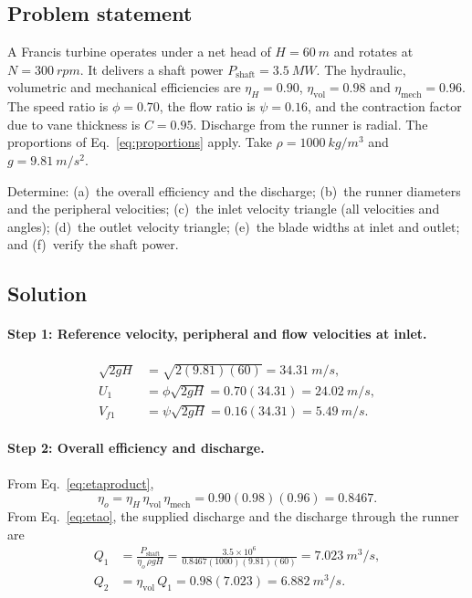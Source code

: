 \documentclass[11pt,a4paper]{article}
\numberwithin{equation}{section}
\begin{document}
\subsection{Problem statement}

A Francis turbine operates under a net head of $H = \SI{60}{m}$ and rotates at $N = \SI{300}{rpm}$. It delivers a shaft power $P_{\mathrm{shaft}} = \SI{3.5}{MW}$. The hydraulic, volumetric and mechanical efficiencies are $\eta_H = 0.90$, $\eta_{\mathrm{vol}} = 0.98$ and $\eta_{\mathrm{mech}} = 0.96$. The speed ratio is $\phi = 0.70$, the flow ratio is $\psi = 0.16$, and the contraction factor due to vane thickness is $C = 0.95$. Discharge from the runner is radial. The proportions of Eq.~\eqref{eq:proportions} apply. Take $\rho = \SI{1000}{kg/m^3}$ and $g = \SI{9.81}{m/s^2}$.

Determine: (a)~the overall efficiency and the discharge; (b)~the runner diameters and the peripheral velocities; (c)~the inlet velocity triangle (all velocities and angles); (d)~the outlet velocity triangle; (e)~the blade widths at inlet and outlet; and (f)~verify the shaft power.

\subsection{Solution}

\paragraph{Step 1: Reference velocity, peripheral and flow velocities at inlet.}
\begin{align}
  \sqrt{2gH} &= \sqrt{2(9.81)(60)} = \SI{34.31}{m/s}, \label{eq:ex-ref}\\
  U_1 &= \phi\sqrt{2gH} = 0.70(34.31) = \SI{24.02}{m/s}, \label{eq:ex-U1}\\
  V_{f1} &= \psi\sqrt{2gH} = 0.16(34.31) = \SI{5.49}{m/s}. \label{eq:ex-Vf1}
\end{align}

\paragraph{Step 2: Overall efficiency and discharge.} From Eq.~\eqref{eq:etaproduct},
\begin{equation}
  \eta_o = \eta_H\,\eta_{\mathrm{vol}}\,\eta_{\mathrm{mech}} = 0.90(0.98)(0.96) = 0.8467.
  \label{eq:ex-eta}
\end{equation}
From Eq.~\eqref{eq:etao}, the supplied discharge and the discharge through the runner are
\begin{align}
  Q_1 &= \frac{P_{\mathrm{shaft}}}{\eta_o\,\rho g H} = \frac{3.5\times10^{6}}{0.8467(1000)(9.81)(60)} = \SI{7.023}{m^3/s}, \label{eq:ex-Q1}\\
  Q_2 &= \eta_{\mathrm{vol}}\,Q_1 = 0.98(7.023) = \SI{6.882}{m^3/s}. \label{eq:ex-Q2}
\end{align}
\end{document}
